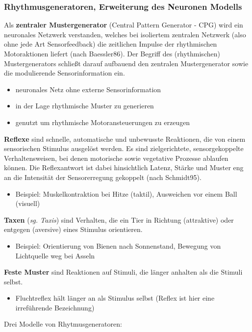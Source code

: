 \subsubsection{Rhythmusgeneratoren, Erweiterung des Neuronen Modells}
Als \textbf{zentraler Mustergenerator} (Central Pattern Generator - CPG)
wird ein neuronales Netzwerk verstanden, welches bei isoliertem
zentralen Netzwerk (also ohne jede Art Sensorfeedback) die zeitlichen
Impulse der rhythmischen Motoraktionen liefert (nach Baessler86). Der
Begriff des (rhythmischen) Mustergenerators schließt darauf
aufbauend den zentralen Mustergenerator sowie die modulierende
Sensorinformation ein.
\begin{itemize}
\item neuronales Netz ohne externe Sensorinformation
\item in der Lage rhythmische Muster zu generieren
\item genutzt um rhythmische Motoransteuerungen zu erzeugen
\end{itemize}
\textbf{Reflexe} sind schnelle, automatische und unbewusste Reaktionen,
die von einem sensorischen Stimulus ausgelöst werden. Es sind zielgerichtete, sensorgekoppelte Verhaltensweisen,
bei denen motorische sowie vegetative Prozesse ablaufen können.
Die Reflexantwort ist dabei hinsichtlich Latenz, Stärke und Muster
eng an die Intensität der Sensorerregung gekoppelt (nach Schmidt95).
\begin{itemize}
\item Beispiel: Muskelkontraktion bei Hitze (taktil), Ausweichen vor einem Ball (visuell)
\end{itemize}
\textbf{Taxen} (\textit{sg. Taxis}) sind Verhalten, die ein Tier in Richtung (attraktive) oder
entgegen (aversive) eines Stimulus orientieren.
\begin{itemize}
\item Beispiel: Orientierung von Bienen nach Sonnenstand, Bewegung von Lichtquelle weg bei Asseln
\end{itemize}
\textbf{Feste Muster} sind Reaktionen auf Stimuli, die länger anhalten als die Stimuli selbst.
\begin{itemize}
\item Fluchtreflex hält länger an als Stimulus selbst (\glqq Reflex\grqq{} ist hier eine irreführende Bezeichnung)
\end{itemize}
Drei Modelle von Rhytmusgeneratoren:
